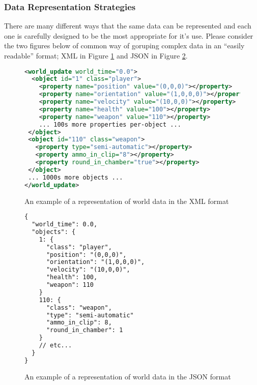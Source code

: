 \subsubsection{Data Representation Strategies}
There are many different ways that the same data can be represented and each one is carefully designed to be the most appropriate for it's use. Please consider the two figures below of common way of goruping complex data in an ``easily readable'' format; XML in Figure \ref{fig:xml-example} and JSON in Figure \ref{fig:json-example}.

\newpage
\begin{figure}[!ht]
\begin{lstlisting}[language=xml]
<world_update world_time="0.0">
  <object id="1" class="player">
    <property name="position" value="(0,0,0)"></property>
    <property name="orientation" value="(1,0,0,0)"></property>
    <property name="velocity" value="(10,0,0)"></property>
    <property name="health" value="100"></property>
    <property name="weapon" value="110"></property>
    ... 100s more properties per-object ...
 </object>
 <object id="110" class="weapon">
   <property type="semi-automatic"></property>
   <property ammo_in_clip="8"></property>
   <property round_in_chamber="true"></property>
 </object>
 ... 1000s more objects ...
</world_update>
\end{lstlisting}

\caption{An example of a representation of world data in the XML format}
\label{fig:xml-example}
\end{figure}

\begin{figure}[!ht]
\begin{lstlisting}[language=xml]
  {
  "world_time": 0.0,
  "objects": {
    1: {
      "class": "player",
      "position": "(0,0,0)",
      "orientation": "(1,0,0,0)",
      "velocity": "(10,0,0)",
      "health": 100,
      "weapon": 110
    }
    110: {
      "class": "weapon",
      "type": "semi-automatic"
      "ammo_in_clip": 8,
      "round_in_chamber": 1
    }
    // etc...
  }
}

\end{lstlisting}

\caption{An example of a representation of world data in the JSON format}
\label{fig:json-example}
\end{figure}

\newpage


